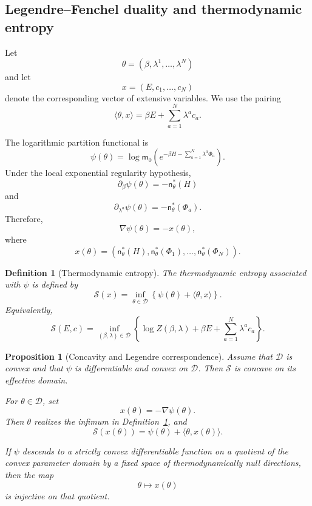 \documentclass[10pt,a4paper]{amsart}
\newtheorem{Proposition}[Theorem]{Proposition}
\newtheorem{Definition}[Theorem]{Definition}
\begin{document}
\subsection{Legendre--Fenchel duality and thermodynamic entropy}
\label{subsec:legendre-duality}

Let
\[
\theta=(\beta,\lambda^1,\ldots,\lambda^N)
\]
and let
\[
x=(E,c_1,\ldots,c_N)
\]
denote the corresponding vector of extensive variables. We use the
pairing
\[
\langle\theta,x\rangle
=
\beta E+\sum_{a=1}^{N}\lambda^a c_a.
\]

The logarithmic partition functional is
\[
\psi(\theta)
=
\log\mathsf m_0
\left(
e^{-\beta H-\sum_{a=1}^{N}\lambda^a\Phi_a}
\right).
\]
Under the local exponential regularity hypothesis,
\[
\partial_\beta\psi(\theta)
=
-\mathsf n_\theta^*(H)
\]
and
\[
\partial_{\lambda^a}\psi(\theta)
=
-\mathsf n_\theta^*(\Phi_a).
\]
Therefore,
\[
\nabla\psi(\theta)
=
-x(\theta),
\]
where
\[
x(\theta)
=
\left(
\mathsf n_\theta^*(H),
\mathsf n_\theta^*(\Phi_1),
\ldots,
\mathsf n_\theta^*(\Phi_N)
\right).
\]

\begin{Definition}[Thermodynamic entropy]
\label{def:thermodynamic-entropy}
The thermodynamic entropy associated with $\psi$ is defined by
\[
\mathcal S(x)
=
\inf_{\theta\in\mathcal D}
\left\{
\psi(\theta)+\langle\theta,x\rangle
\right\}.
\]
Equivalently,
\[
\mathcal S(E,c)
=
\inf_{(\beta,\lambda)\in\mathcal D}
\left\{
\log Z(\beta,\lambda)
+
\beta E
+
\sum_{a=1}^{N}\lambda^a c_a
\right\}.
\]
\end{Definition}

\begin{Proposition}[Concavity and Legendre correspondence]
\label{prop:legendre}
Assume that $\mathcal D$ is convex and that $\psi$ is differentiable
and convex on $\mathcal D$. Then $\mathcal S$ is concave on its
effective domain.

For $\theta\in\mathcal D$, set
\[
x(\theta)=-\nabla\psi(\theta).
\]
Then $\theta$ realizes the infimum in
Definition~\ref{def:thermodynamic-entropy}, and
\[
\mathcal S(x(\theta))
=
\psi(\theta)+\langle\theta,x(\theta)\rangle.
\]

If $\psi$ descends to a strictly convex differentiable function on a
quotient of the convex parameter domain by a fixed space of
thermodynamically null directions, then the map
\[
\theta\longmapsto x(\theta)
\]
is injective on that quotient.
\end{Proposition}
\end{document}
